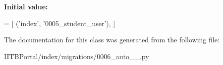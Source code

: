 {\bfseries Initial value\+:}
\begin{DoxyCode}
=  [
        (\textcolor{stringliteral}{'index'}, \textcolor{stringliteral}{'0005\_student\_user'}),
    ]
\end{DoxyCode}


The documentation for this class was generated from the following file\+:\begin{DoxyCompactItemize}
\item 
I\+I\+T\+B\+Portal/index/migrations/0006\+\_\+auto\+\_\+\_.\+py\end{DoxyCompactItemize}
